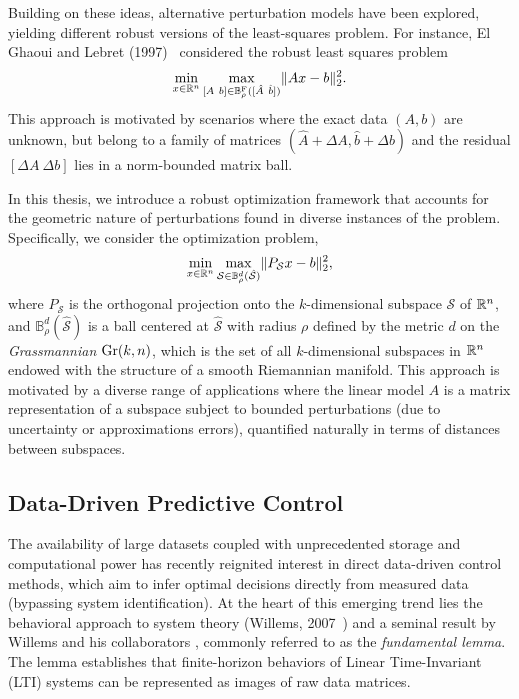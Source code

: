 Building on these ideas, alternative perturbation models have been explored, yielding different robust versions of the least-squares problem. For instance, El Ghaoui and Lebret (1997)~\cite{ghaoui97} considered the robust least squares problem
\begin{equation}
    \min_{x \in \mathbb{R}^n} \max_{[A \ b] \in \mathbb{B}^{\textrm{F}}_{\rho}([\hat{A} \ \hat{b}])} \lVert Ax - b \rVert_2^2.
\end{equation}
This approach is motivated by scenarios where the exact data $(A,b)$ are unknown, but belong to a family of matrices $(\hat{A} + \Delta A , \hat{b} + \Delta b)$ and the residual $[\Delta A \ \Delta b]$ lies in a norm-bounded matrix ball.

In this thesis, we introduce a robust optimization framework that accounts for the geometric nature of perturbations found in diverse instances of the problem. Specifically, we consider the optimization problem,
\begin{equation}
    \min_{x \in \mathbb{R}^n} \max_{\mathcal{S} \in \mathbb{B}^d_{\rho}(\hat{\mathcal{S}})} \lVert P_{\mathcal{S}} x - b \rVert_2^2,
\end{equation}
where $P_{\mathcal{S}}$ is the orthogonal projection onto the $k$-dimensional subspace $\mathcal{S}$ of $\mathbb{R}^n$, and $\mathbb{B}^d_{\rho}(\hat{\mathcal{S}})$ is a ball centered at $\hat{\mathcal{S}}$ with radius $\rho$ defined by the metric $d$ on the \textit{Grassmannian} $\text{Gr}(k,n)$, which is  the set of all $k$-dimensional subspaces in $\mathbb{R}^n$ endowed with the structure of a smooth Riemannian manifold. This approach is motivated by a diverse range of applications where the linear model $A$ is a matrix representation of a subspace subject to bounded perturbations (due to uncertainty or approximations errors), quantified naturally in terms of distances between subspaces.

\subsection{Data-Driven Predictive Control}

The availability of large datasets coupled with unprecedented storage and computational power has recently reignited interest in direct data-driven control methods, which aim to infer optimal decisions directly from measured data (bypassing system identification). At the heart of this emerging trend lies the behavioral approach to system theory (Willems, 2007~\cite{willems2007}) and a seminal result by Willems and his collaborators \cite{willems2005}, commonly referred to as the \textit{fundamental lemma}. The lemma establishes that finite-horizon behaviors of Linear Time-Invariant (LTI) systems can be represented as images of raw data matrices. 

